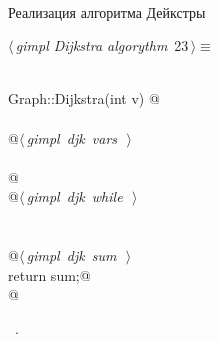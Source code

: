 \documentclass[12pt]{article}
\begin{document}
\paragraph{}
Реализация алгоритма Дейкстры \cite{Dijkstra}
\begin{flushleft} \small
\begin{minipage}{\linewidth}\label{scrap36}\raggedright\small
{} $\langle\,${\itshape gimpl Dijkstra algorythm}\nobreak\ {\footnotesize {23}}$\,\rangle\equiv$
\vspace{-1ex}
\begin{list}{}{} \item
\mbox{}\verb@@\\
\mbox{}\verb@double Graph::Dijkstra(int v) {@\\
\mbox{}\verb@@\\
\mbox{}\verb@    @\hbox{$\langle\,${\itshape gimpl djk vars}\nobreak\ {\footnotesize {}}$\,\rangle$}\verb@@\\
\mbox{}\verb@@\\
\mbox{}\verb@    @\\
\mbox{}\verb@    @\hbox{$\langle\,${\itshape gimpl djk while}\nobreak\ {\footnotesize {}}$\,\rangle$}\verb@@\\
\mbox{}\verb@@\\
\mbox{}\verb@@\\
\mbox{}\verb@    @\hbox{$\langle\,${\itshape gimpl djk sum}\nobreak\ {\footnotesize {}}$\,\rangle$}\verb@@\\
\mbox{}\verb@    return sum;@\\
\mbox{}\verb@}@\\
\mbox{}\verb@@{\NWsep}
\end{list}
\vspace{-1.5ex}
\footnotesize
\begin{list}{}{\setlength{\itemsep}{-\parsep}\setlength{\itemindent}{-\leftmargin}}
\item \NWtxtMacroRefIn\ .

\item{}
\end{list}
\end{minipage}\vspace{4ex}
\end{flushleft}
\end{document}

